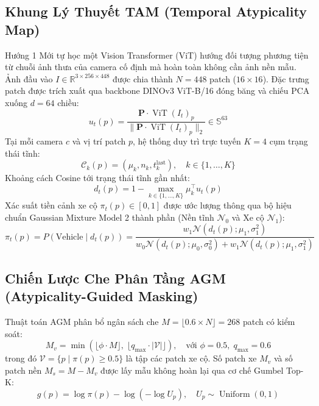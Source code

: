 \documentclass[11pt,a4paper]{article}
\begin{document}
\subsection{Khung Lý Thuyết TAM (Temporal Atypicality Map)}
Hướng 1 Mới tự học một Vision Transformer (ViT) hướng đối tượng phương tiện từ chuỗi ảnh thưa của camera cố định mà hoàn toàn không cần ảnh nền mẫu.
Ảnh đầu vào $I \in \mathbb{R}^{3 \times 256 \times 448}$ được chia thành $N = 448$ patch ($16 \times 16$). Đặc trưng patch được trích xuất qua backbone DINOv3 ViT-B/16 đóng băng và chiếu PCA xuống $d = 64$ chiều:
\begin{equation}
    u_t(p) = \frac{\mathbf{P} \cdot \operatorname{ViT}(I_t)_p}{\|\mathbf{P} \cdot \operatorname{ViT}(I_t)_p\|_2} \in \mathbb{S}^{63}
\end{equation}
Tại mỗi camera $c$ và vị trí patch $p$, hệ thống duy trì trực tuyến $K = 4$ cụm trạng thái tĩnh:
\begin{equation}
    \mathcal{C}_k(p) = \left(\mu_k, n_k, t_k^{\text{last}}\right), \quad k \in \{1, \dots, K\}
\end{equation}
Khoảng cách Cosine tới trạng thái tĩnh gần nhất:
\begin{equation}
    d_t(p) = 1 - \max_{k \in \{1, \dots, K\}} \mu_k^\top u_t(p)
\end{equation}
Xác suất tiền cảnh xe cộ $\pi_t(p) \in [0, 1]$ được ước lượng thông qua bộ hiệu chuẩn Gaussian Mixture Model 2 thành phần (Nền tĩnh $\mathcal{N}_0$ và Xe cộ $\mathcal{N}_1$):
\begin{equation}
    \pi_t(p) = P(\text{Vehicle} \mid d_t(p)) = \frac{w_1 \mathcal{N}(d_t(p); \mu_1, \sigma_1^2)}{w_0 \mathcal{N}(d_t(p); \mu_0, \sigma_0^2) + w_1 \mathcal{N}(d_t(p); \mu_1, \sigma_1^2)}
\end{equation}

\subsection{Chiến Lược Che Phân Tầng AGM (Atypicality-Guided Masking)}
Thuật toán AGM phân bổ ngân sách che $M = \lfloor 0.6 \times N \rfloor = 268$ patch có kiểm soát:
\begin{equation}
    M_v = \min\left( \lfloor \phi \cdot M \rfloor, \; \lfloor q_{\max} \cdot |\mathcal{V}| \rfloor \right), \quad \text{với } \phi = 0.5, \; q_{\max} = 0.6
\end{equation}
trong đó $\mathcal{V} = \{p \mid \pi(p) \ge 0.5\}$ là tập các patch xe cộ. Số patch xe $M_v$ và số patch nền $M_s = M - M_v$ được lấy mẫu không hoàn lại qua cơ chế Gumbel Top-K:
\begin{equation}
    g(p) = \log \pi(p) - \log(-\log U_p), \quad U_p \sim \operatorname{Uniform}(0, 1)
\end{equation}
\end{document}
